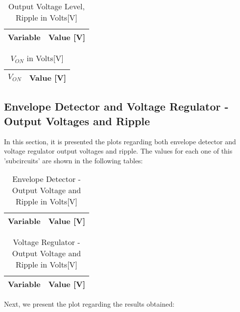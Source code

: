 \begin{table}[H]
  \centering
  \begin{tabular}{|l|r|}
    \hline    
    {\bf Variable} & {\bf Value [V]} \\ \hline
    
  \end{tabular}
  \caption{Output Voltage Level, Ripple in Volts[V]}
  \label{tab:out_voltage}
\end{table}


\begin{table}[H]
  \centering
  \begin{tabular}{|l|r|}
    \hline    
    {\bf $V_{ON}$} & {\bf Value [V]} \\ \hline
    
  \end{tabular}
  \caption{$V_{ON}$ in Volts[V]}
  \label{tab:v_on}
\end{table}


\newpage
\subsection{Envelope Detector and Voltage Regulator - Output Voltages and Ripple}

\par In this section, it is presented the plots regarding both envelope detector and voltage regulator output voltages and ripple.
The values for each one of this 'subcircuits' are shown in the following tables:

\begin{table}[H]
  \centering
  \begin{tabular}{|l|r|}
    \hline    
    {\bf Variable} & {\bf Value [V]} \\ \hline
    
  \end{tabular}
  \caption{Envelope Detector - Output Voltage and Ripple in Volts[V]}
  \label{tab:out_env}
\end{table}

\begin{table}[H]
  \centering
  \begin{tabular}{|l|r|}
    \hline    
    {\bf Variable} & {\bf Value [V]} \\ \hline
    
  \end{tabular}
  \caption{Voltage Regulator - Output Voltage and Ripple in Volts[V]}
  \label{tab:out_voltage2}
\end{table}


Next, we present the plot regarding the results obtained:

